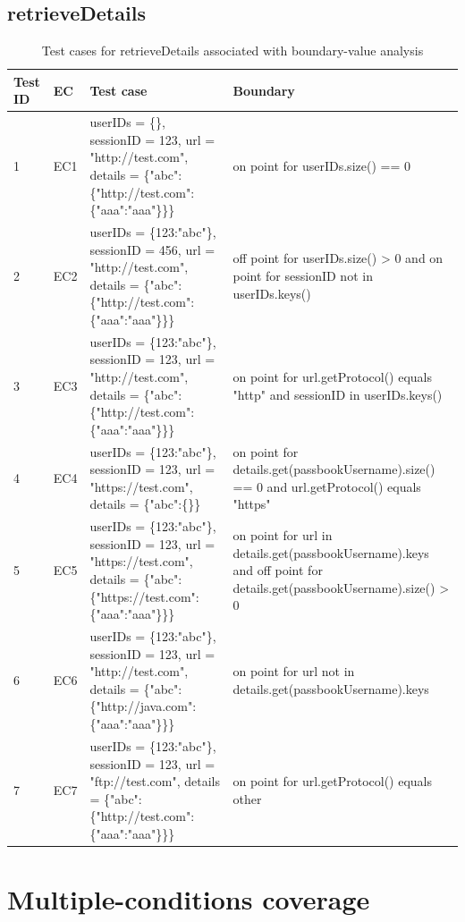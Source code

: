 \documentclass{article}
\begin{document}
\subsection{retrieveDetails}
\begin{longtable}{|p{0.5cm}|p{0.5cm}|p{7cm}|p{5cm}|}
\caption{Test cases for retrieveDetails associated with boundary-value analysis}\\
\hline 
Test ID&EC&Test case&Boundary\\
\hline  
1&EC1&userIDs = \{\}, sessionID = 123, url = "http://test.com", details = \{"abc":\{"http://test.com":\{"aaa":"aaa"\}\}\}&on point for userIDs.size() == 0\\
\hline
2&EC2&userIDs = \{123:"abc"\}, sessionID = 456, url = "http://test.com", details = \{"abc":\{"http://test.com":\{"aaa":"aaa"\}\}\}&off point for userIDs.size() > 0 and on point for sessionID not in userIDs.keys()\\
\hline
3&EC3&userIDs = \{123:"abc"\}, sessionID = 123, url = "http://test.com", details = \{"abc":\{"http://test.com":\{"aaa":"aaa"\}\}\}& on point for url.getProtocol() equals "http" and sessionID in userIDs.keys()\\
\hline
4&EC4&userIDs = \{123:"abc"\}, sessionID = 123, url = "https://test.com", details = \{"abc":\{\}\}&on point for details.get(passbookUsername).size() == 0 and url.getProtocol() equals "https"\\
\hline
5&EC5&userIDs = \{123:"abc"\}, sessionID = 123, url = "https://test.com", details = \{"abc":\{"https://test.com":\{"aaa":"aaa"\}\}\}&on point for url in details.get(passbookUsername).keys and off point for details.get(passbookUsername).size() > 0\\
\hline
6&EC6&userIDs = \{123:"abc"\}, sessionID = 123, url = "http://test.com", details = \{"abc":\{"http://java.com":\{"aaa":"aaa"\}\}\}&on point for url not in details.get(passbookUsername).keys\\
\hline
7&EC7&userIDs = \{123:"abc"\}, sessionID = 123, url = "ftp://test.com", details = \{"abc":\{"http://test.com":\{"aaa":"aaa"\}\}\}&on point for url.getProtocol() equals other\\
\hline
\end{longtable}



\section{Multiple-conditions coverage}
\end{document}
